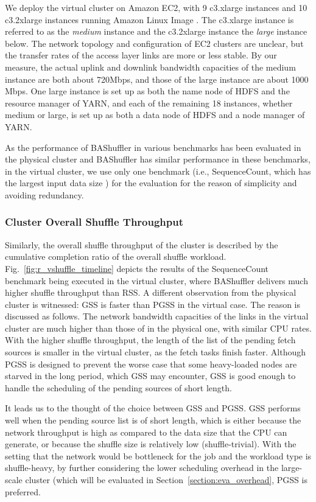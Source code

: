 \documentclass[10pt,journal,compsoc]{IEEEtran}
\begin{document}
We deploy the virtual cluster on Amazon EC2, with 9 c3.xlarge
instances and 10 c3.2xlarge instances running
Amazon Linux Image \cite{aws}. The c3.xlarge instance is referred to as the \emph{medium} instance 
and the c3.2xlarge instance the \emph{large} instance below. 
The network topology and configuration of EC2 clusters are unclear, 
but the transfer rates of the access layer links are more or less stable. 
By our measure, the actual uplink and downlink bandwidth capacities of
the medium instance are both about 720Mbps, 
and those of the large instance are about 1000 Mbps. 
One large instance is set up as both the name node of HDFS and the
resource manager of YARN,
and each of the remaining 18 instances, whether medium or large,
is set up as both a data node of HDFS and a node manager of YARN. 

As the performance of BAShuffler in various benchmarks has been
evaluated in the physical cluster
and BAShuffler has similar performance in these benchmarks, in the virtual cluster, 
we use only one benchmark (i.e., SequenceCount, which has the largest
input data size ) for the evaluation for the reason of simplicity and avoiding redundancy.

\subsubsection{Cluster Overall Shuffle Throughput}
Similarly, the overall shuffle throughput of the cluster is described by the cumulative completion ratio of the overall shuffle workload. 
Fig.~\ref{fig:r_vshuffle_timeline} depicts the results of the
SequenceCount benchmark being executed in the virtual cluster, 
where BAShuffler delivers much higher shuffle throughput than RSS. 
A different observation from the physical cluster is witnessed: GSS is faster than PGSS in the virtual case. 
The reason is discussed as follows. 
The network bandwidth capacities of the links in the virtual cluster are much higher than those of in the physical one, with similar CPU rates. 
With the higher shuffle throughput, the length of the list of the pending fetch sources is smaller in the virtual cluster, as the fetch tasks finish faster. 
Although PGSS is designed to prevent the worse
case that some heavy-loaded nodes are starved in the long period, which GSS may encounter, 
GSS is good enough to handle the scheduling of the pending sources of short length. 

It leads us to the thought of the choice between GSS and PGSS. 
GSS performs well when the pending source list is of short length, which is either because the network throughput is high as compared to the data size that the CPU can generate, or because the shuffle size is relatively low (shuffle-trivial). With the setting that the network would be bottleneck for the job and the workload type is shuffle-heavy, by further considering the lower scheduling overhead in the large-scale cluster (which will be evaluated in Section~\ref{section:eva_overhead}, PGSS is preferred. 
\end{document}
